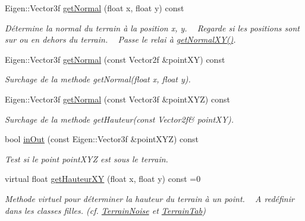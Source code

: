 \begin{DoxyCompactItemize}
\item 
Eigen\+::\+Vector3f \hyperlink{class_terrain_a60758bba8c5f1cfefe60498dab2b571d}{get\+Normal} (float x, float y) const 
\begin{DoxyCompactList}\small\item\em Détermine la normal du terrain à la position {\itshape x}, {\itshape y}. ~\newline
Regarde si les positions sont sur ou en dehors du terrain. ~\newline
Passe le relai à \hyperlink{class_terrain_a8b666ed9d5f948734b0d1c49adb6b535}{get\+Normal\+X\+Y()}. \end{DoxyCompactList}\item 
Eigen\+::\+Vector3f \hyperlink{class_terrain_a7c232e0d5b97f497e37229c8927dc112}{get\+Normal} (const Vector2f \&point\+X\+Y) const 
\begin{DoxyCompactList}\small\item\em Surchage de la methode get\+Normal(float x, float y). \end{DoxyCompactList}\item 
Eigen\+::\+Vector3f \hyperlink{class_terrain_a885582cef2dfe1133db04045725f73bd}{get\+Normal} (const Vector3f \&point\+X\+Y\+Z) const 
\begin{DoxyCompactList}\small\item\em Surchage de la methode get\+Hauteur(const Vector2f\& point\+X\+Y). \end{DoxyCompactList}\item 
bool \hyperlink{class_terrain_a75b8699997d2aff3eb461cf8a9220bb4}{in\+Out} (const Eigen\+::\+Vector3f \&point\+X\+Y\+Z) const 
\begin{DoxyCompactList}\small\item\em Test si le point {\itshape point\+X\+Y\+Z} est sous le terrain. \end{DoxyCompactList}\item 
virtual float \hyperlink{class_terrain_a63c855275f8270ccc0203bde0776a08f}{get\+Hauteur\+X\+Y} (float x, float y) const  =0
\begin{DoxyCompactList}\small\item\em Methode virtuel pour déterminer la hauteur du terrain à un point. ~\newline
A redéfinir dans les classes filles. (cf. \hyperlink{class_terrain_noise}{Terrain\+Noise} et \hyperlink{class_terrain_tab}{Terrain\+Tab}) \end{DoxyCompactList}\end{DoxyCompactItemize}
